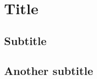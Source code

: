 \documentclass{elsarticle}
\begin{document}
\section{Title}

\subsection{Subtitle}

\blindtext

\subsection{Another subtitle}

\blindtext
\end{document}
